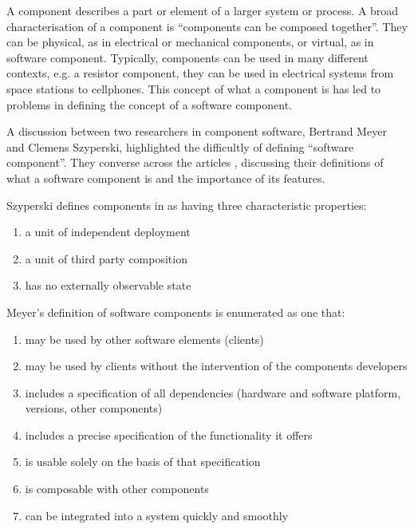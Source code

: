 A component describes a part or element of a larger system or process.
A broad characterisation of a component is ``components can be composed together''.
They can be physical, as in electrical or mechanical components, or virtual, as in software component.
Typically, components can be used in many different contexts, e.g. a resistor component, they can be used in electrical systems from space stations to cellphones.   
This concept of what a component is has led to problems in defining the concept of a software component.

A discussion between two researchers in component software, Bertrand Meyer and Clemens Szyperski, highlighted the difficultly of defining ``software component''. 
They converse across the articles \cite{Meyer1999,Szyperski2000a, Szyperski2000, Meyer2000}, discussing their definitions of what a software component is and the importance of its features.

Szyperski defines components in \citep{Szyperski2002} as having three characteristic properties:
\begin{enumerate}
  \item a unit of independent deployment
  \item a unit of third party composition
  \item has no externally observable state
\end{enumerate}

Meyer's definition of software components is enumerated as one that:
\begin{enumerate}
  \item may be used by other software elements (clients)
  \item may be used by clients without the intervention of the components developers
  \item includes a specification of all dependencies (hardware and software platform, versions, other components)
  \item includes a precise specification of the functionality it offers
  \item is usable solely on the basis of that specification
  \item is composable with other components
  \item can be integrated into a system quickly and smoothly
\end{enumerate}


